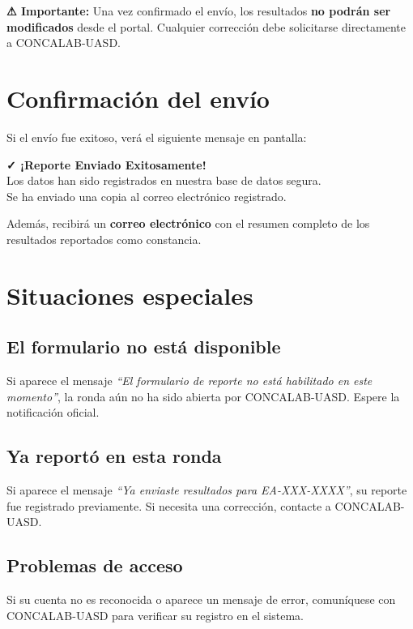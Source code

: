 \documentclass[12pt, letterpaper]{article}
\begin{document}
\begin{cajaaviso}
\textbf{⚠ Importante:} Una vez confirmado el envío, los resultados \textbf{no podrán ser modificados} desde el portal. Cualquier corrección debe solicitarse directamente a CONCALAB-UASD.
\end{cajaaviso}

\section{Confirmación del envío}

Si el envío fue exitoso, verá el siguiente mensaje en pantalla:

\begin{cajaexito}
\textbf{✓ ¡Reporte Enviado Exitosamente!}\\
Los datos han sido registrados en nuestra base de datos segura.\\
Se ha enviado una copia al correo electrónico registrado.
\end{cajaexito}

Además, recibirá un \textbf{correo electrónico} con el resumen completo de los resultados reportados como constancia.

\section{Situaciones especiales}

\subsection{El formulario no está disponible}
Si aparece el mensaje \textit{``El formulario de reporte no está habilitado en este momento''}, la ronda aún no ha sido abierta por CONCALAB-UASD. Espere la notificación oficial.

\subsection{Ya reportó en esta ronda}
Si aparece el mensaje \textit{``Ya enviaste resultados para EA-XXX-XXXX''}, su reporte fue registrado previamente. Si necesita una corrección, contacte a CONCALAB-UASD.

\subsection{Problemas de acceso}
Si su cuenta no es reconocida o aparece un mensaje de error, comuníquese con CONCALAB-UASD para verificar su registro en el sistema.
\end{document}
